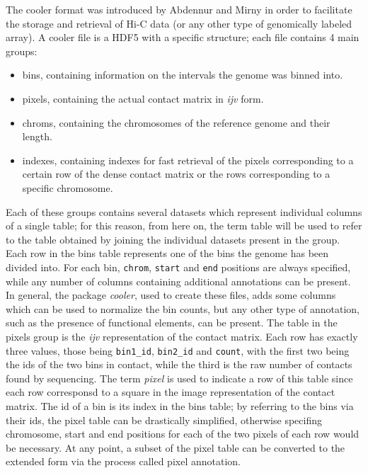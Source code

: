 The cooler format was introduced by Abdennur and Mirny\cite{cooler2020} in order to facilitate the storage and retrieval of Hi-C data (or any other type of genomically labeled array). A cooler file is a HDF5 with a specific structure; each file contains 4 main groups:
\begin{itemize}\tightlist
  \item bins, containing information on the intervals the genome was binned into.
  \item pixels, containing the actual contact matrix in \emph{ijv} form.
  \item chroms, containing the chromosomes of the reference genome and their length.
  \item indexes, containing indexes for fast retrieval of the pixels corresponding to a certain row of the dense contact matrix or the rows corresponding to a specific chromosome.
\end{itemize}
Each of these groups contains several datasets which represent individual columns of a single table; for this reason, from here on, the term table will be used to refer to the table obtained by joining the individual datasets present in the group.
Each row in the bins table represents one of the bins the genome has been divided into. For each bin, \texttt{chrom}, \texttt{start} and \texttt{end} positions are always specified, while any number of columns containing additional annotations can be present. In general, the package \emph{cooler}, used to create these files, adds some columns which can be used to normalize the bin counts, but any other type of annotation, such as the presence of functional elements, can be present.
The table in the pixels group is the \emph{ijv} representation of the contact matrix. Each row has exactly three values, those being \texttt{bin1\_id}, \texttt{bin2\_id} and \texttt{count}, with the first two being the ids of the two bins in contact, while the third is the raw number of contacts found by sequencing. The term \emph{pixel} is used to indicate a row of this table since each row corresponsd to a square in the image representation of the contact matrix. The id of a bin is its index in the bins table; by referring to the bins via their ids, the pixel table can be drastically simplified, otherwise specifing chromosome, start and end positions for each of the two pixels of each row would be necessary. At any point, a subset of the pixel table can be converted to the extended form via the process called pixel annotation.

